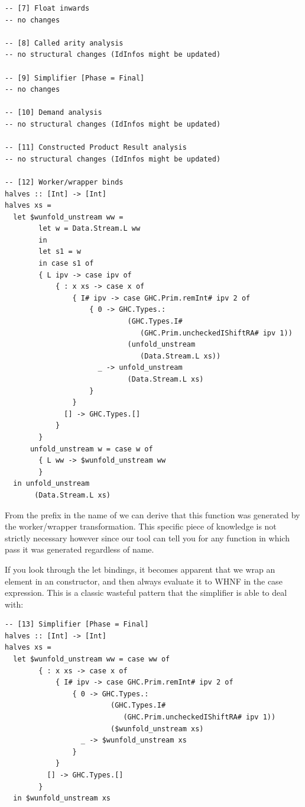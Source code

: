\begin{listing}[H]
\begin{verbatim}
-- [7] Float inwards
-- no changes

-- [8] Called arity analysis
-- no structural changes (IdInfos might be updated)

-- [9] Simplifier [Phase = Final]
-- no changes

-- [10] Demand analysis
-- no structural changes (IdInfos might be updated)

-- [11] Constructed Product Result analysis
-- no structural changes (IdInfos might be updated)

-- [12] Worker/wrapper binds
halves :: [Int] -> [Int]
halves xs = 
  let $wunfold_unstream ww = 
        let w = Data.Stream.L ww
        in 
        let s1 = w
        in case s1 of
        { L ipv -> case ipv of
            { : x xs -> case x of
                { I# ipv -> case GHC.Prim.remInt# ipv 2 of
                    { 0 -> GHC.Types.:
                             (GHC.Types.I#
                                (GHC.Prim.uncheckedIShiftRA# ipv 1))
                             (unfold_unstream
                                (Data.Stream.L xs))
                      _ -> unfold_unstream
                             (Data.Stream.L xs)
                    }
                }
              [] -> GHC.Types.[]
            }
        }
      unfold_unstream w = case w of
        { L ww -> $wunfold_unstream ww
        }
  in unfold_unstream
       (Data.Stream.L xs)
\end{verbatim}
\end{listing}

From the  prefix in the name of  we can derive that this function was generated by the worker/wrapper transformation.
This specific piece of knowledge is not strictly necessary however since our tool can tell you for any function in which pass it was generated regardless
of name.

If you look through the let bindings, it becomes apparent that we wrap an element  in an  constructor, and then always evaluate it to WHNF
in the case expression. This is a classic wasteful pattern that the simplifier is able to deal with:

\begin{listing}[H]
\begin{verbatim}
-- [13] Simplifier [Phase = Final]
halves :: [Int] -> [Int]
halves xs = 
  let $wunfold_unstream ww = case ww of
        { : x xs -> case x of
            { I# ipv -> case GHC.Prim.remInt# ipv 2 of
                { 0 -> GHC.Types.:
                         (GHC.Types.I#
                            (GHC.Prim.uncheckedIShiftRA# ipv 1))
                         ($wunfold_unstream xs)
                  _ -> $wunfold_unstream xs
                }
            }
          [] -> GHC.Types.[]
        }
  in $wunfold_unstream xs
\end{verbatim}
\end{listing}

